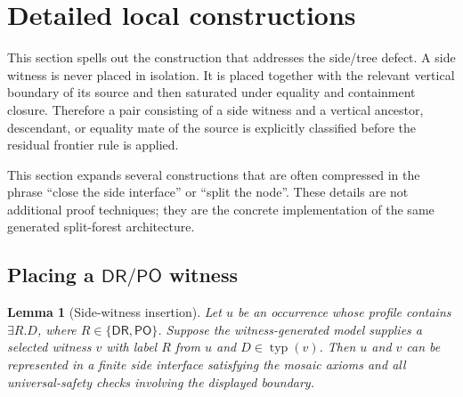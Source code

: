 \documentclass[11pt]{article}
\newtheorem{lemma}[theorem]{Lemma}
\newcommand{\DR}{\mathsf{DR}}
\newcommand{\PO}{\mathsf{PO}}
\newcommand{\typ}{\operatorname{typ}}
\begin{document}
\section{Detailed local constructions}

This section spells out the construction that addresses the side/tree defect.  A side witness is never placed in isolation.  It is placed together with the relevant vertical boundary of its source and then saturated under equality and containment closure.  Therefore a pair consisting of a side witness and a vertical ancestor, descendant, or equality mate of the source is explicitly classified before the residual frontier rule is applied.

\label{sec:detailed-local}

This section expands several constructions that are often compressed in the phrase ``close the side interface'' or ``split the node''.  These details are not additional proof techniques; they are the concrete implementation of the same generated split-forest architecture.

\subsection{Placing a \texorpdfstring{$\DR/\PO$}{DR/PO} witness}

\begin{lemma}[Side-witness insertion]\label{lem:side-witness-insertion}
Let $u$ be an occurrence whose profile contains $\exists R.D$, where $R\in\{\DR,\PO\}$.  Suppose the witness-generated model supplies a selected witness $v$ with label $R$ from $u$ and $D\in\typ(v)$.  Then $u$ and $v$ can be represented in a finite side interface satisfying the mosaic axioms and all universal-safety checks involving the displayed boundary.
\end{lemma}
\end{document}
